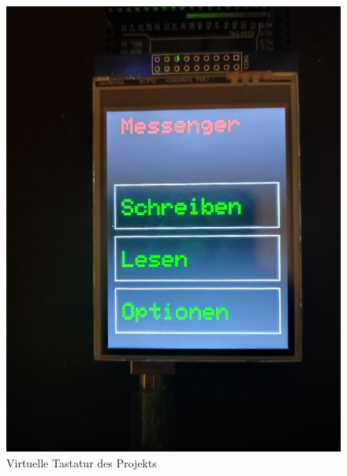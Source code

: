\documentclass[a4paper, 11pt]{scrartcl}
\begin{document}
\begin{small}
\begin{figure}[H]
    \begin{center}
        \includegraphics[scale=0.13]{Bilder/MainMenu_green_text.jpeg}
        \caption{Virtuelle Tastatur des Projekts}\label{pic:menu_green}
    \end{center}
\end{figure}


\end{small}
\end{document}
